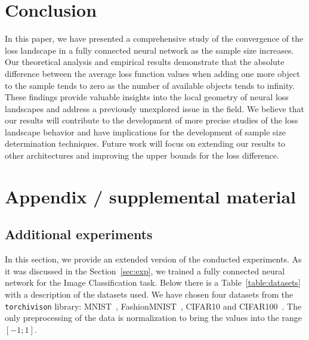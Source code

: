 \documentclass{article}
\begin{document}
\section{Conclusion}\label{sec:concl}

In this paper, we have presented a comprehensive study of the convergence of the loss landscape in a fully connected neural network as the sample size increases. Our theoretical analysis and empirical results demonstrate that the absolute difference between the average loss function values when adding one more object to the sample tends to zero as the number of available objects tends to infinity. These findings provide valuable insights into the local geometry of neural loss landscapes and address a previously unexplored issue in the field. We believe that our results will contribute to the development of more precise studies of the loss landscape behavior and have implications for the development of sample size determination techniques. Future work will focus on extending our results to other architectures and improving the upper bounds for the loss difference.







\newpage
\appendix
\section{Appendix / supplemental material}\label{app}

\subsection{Additional experiments}\label{app:exp}

In this section, we provide an extended version of the conducted experiments. As it was discussed in the Section~\ref{sec:exp}, we trained a fully connected neural network for the Image Classification task. Below there is a Table~\ref{table:datasets} with a description of the datasets used. We have chosen four datasets from the \texttt{torchivison} library: MNIST~\cite{deng2012mnist}, FashionMNIST~\cite{xiao2017fashionmnistnovelimagedataset}, CIFAR10 and CIFAR100~\cite{krizhevsky2009learning}. The only preprocessing of the data is normalization to bring the values into the range $[-1; 1]$.
\end{document}
